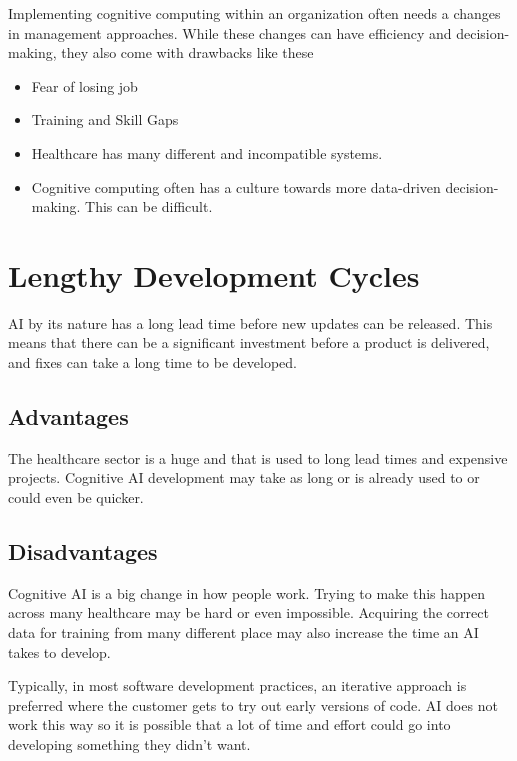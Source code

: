 \documentclass{article}
\begin{document}
Implementing cognitive computing within an organization often needs a changes in management approaches. While these changes can have efficiency and decision-making, they also come with drawbacks like these

\begin{itemize}
\item Fear of losing job
\item Training and Skill Gaps
\item Healthcare has many different and incompatible systems.
\item Cognitive computing often has a culture towards more data-driven decision-making. This can be difficult.
\end{itemize}

\section{Lengthy Development Cycles}
AI by its nature has a long lead time before new updates can be released. This means that there can be a significant investment before a product is delivered, and fixes can take a long time to be developed.

\subsection{Advantages}
The healthcare sector is a huge and that is used to long lead times and expensive projects. Cognitive AI development may take as long or is already used to or could even be quicker.

\subsection{Disadvantages}
Cognitive AI is a big change in how people work. Trying to make this happen across many healthcare may be hard or even impossible. Acquiring the correct data for training from many different place may also increase the time an AI takes to develop.

Typically, in most software development practices, an iterative approach is preferred where the customer gets to try out early versions of code. AI does not work this way so it is possible that a lot of time and effort could go into developing something they didn't want.

\break

\end{document}

